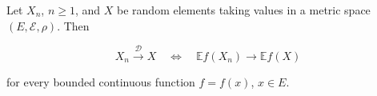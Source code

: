 Let $X_n$, $n \geq 1$, and $X$ be random elements taking values in a metric space $(E, \mathcal{E}, \rho)$. Then

$$X_n \xrightarrow{\mathcal{D}} X \quad\Leftrightarrow\quad \mathbb{E}f(X_n) \to \mathbb{E}f(X)$$

for every bounded continuous function $f = f(x)$, $x \in E$.